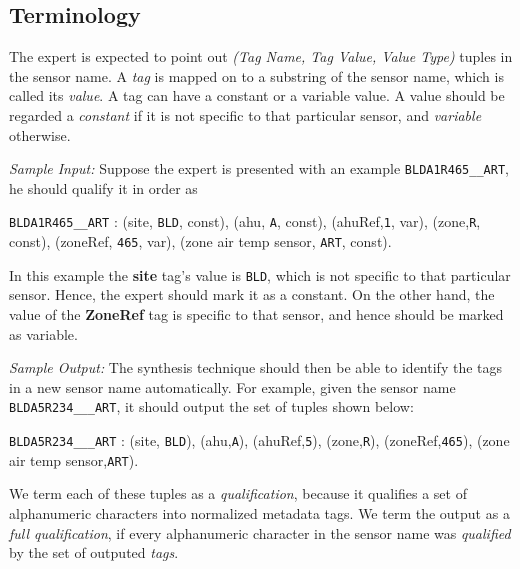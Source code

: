 \subsection{Terminology}

The expert is expected to point out \emph{(Tag Name, Tag Value, Value Type)} tuples in the sensor name. A {\it tag} is mapped on to a substring of the sensor name, which is called its {\it value}. A tag can have a constant or a variable value. A value should be regarded a \emph{constant} if it is not specific to that particular sensor, and \emph{variable} otherwise.

{\it Sample Input:} Suppose the expert is presented with an example \texttt{BLDA1R465\_\_ART}, he should qualify it in order as

 \texttt{BLDA1R465\_\_ART} : (site, \texttt{BLD}, const), (ahu, \texttt{A}, const), (ahuRef,\texttt{1}, var), (zone,\texttt{R}, const), (zoneRef, \texttt{465}, var), (zone air temp sensor, \texttt{ART}, const). 

In this example the {\bf site} tag's value is \texttt{BLD}, which is not specific to that particular sensor. Hence, the expert should mark it as a constant. On the other hand, the value of the {\bf ZoneRef} tag is specific to that sensor, and hence should be marked as variable.

{\it Sample Output:} The synthesis technique should then be able to identify the tags in a new sensor name automatically. For example, given the sensor name \texttt{BLDA5R234\_\_\_ART}, it should output the set of tuples shown below:

\texttt{BLDA5R234\_\_\_ART} : (site, \texttt{BLD}), (ahu,\texttt{A}), (ahuRef,\texttt{5}), (zone,\texttt{R}), (zoneRef,\texttt{465}), (zone air temp sensor,\texttt{ART}).

We term each of these tuples as a {\it qualification}, because it qualifies a set of alphanumeric characters into normalized metadata tags. We term the output as a {\it full qualification}, if every alphanumeric character in the sensor name was {\it qualified} by the set of outputed {\it tags}.

